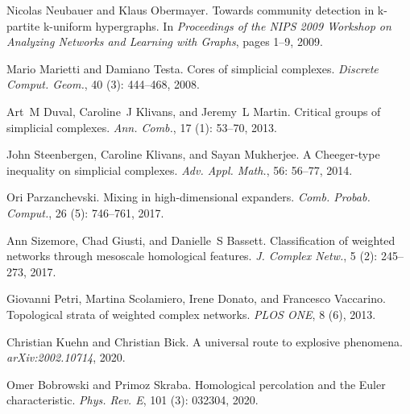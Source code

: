 Nicolas Neubauer and Klaus Obermayer.
\newblock Towards community detection in k-partite k-uniform hypergraphs.
\newblock In \emph{Proceedings of the {{NIPS}} 2009 Workshop on Analyzing
    Networks and Learning with Graphs}, pages 1--9, 2009.

Mario Marietti and Damiano Testa.
\newblock Cores of simplicial complexes.
\newblock \emph{Discrete Comput. Geom.}, 40 (3): 444--468,
2008.

Art~M Duval, Caroline~J Klivans, and Jeremy~L Martin.
\newblock Critical groups of simplicial complexes.
\newblock \emph{Ann. Comb.}, 17 (1): 53--70, 2013.

John Steenbergen, Caroline Klivans, and Sayan Mukherjee.
\newblock A {{Cheeger}}-type inequality on simplicial complexes.
\newblock \emph{Adv. Appl. Math.}, 56: 56--77, 2014.

Ori Parzanchevski.
\newblock Mixing in high-dimensional expanders.
\newblock \emph{Comb. Probab. Comput.}, 26 (5): 746--761,
2017.

Ann Sizemore, Chad Giusti, and Danielle~S Bassett.
\newblock Classification of weighted networks through mesoscale homological
features.
\newblock \emph{J. Complex Netw.}, 5 (2): 245--273, 2017.

Giovanni Petri, Martina Scolamiero, Irene Donato, and Francesco Vaccarino.
\newblock Topological strata of weighted complex networks.
\newblock \emph{PLOS ONE}, 8 (6), 2013.

Christian Kuehn and Christian Bick.
\newblock A universal route to explosive phenomena.
\newblock \emph{arXiv:2002.10714}, 2020.

Omer Bobrowski and Primoz Skraba.
\newblock Homological percolation and the {{Euler}} characteristic.
\newblock \emph{Phys. Rev. E}, 101 (3): 032304, 2020.

